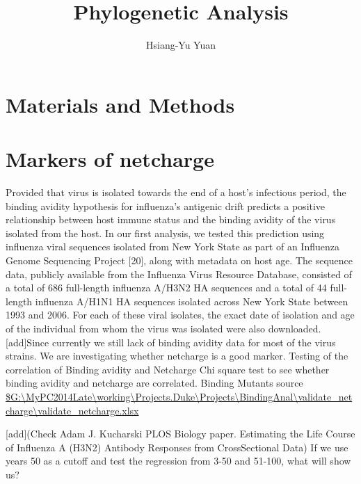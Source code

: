 \documentclass{article}
\begin{document}
\title{Phylogenetic Analysis}
\author{Hsiang-Yu Yuan}
\maketitle


\nocite{*}

\doublespacing
\begin{abstract}
\end{abstract}






\section{Materials and Methods}
                
                
                \section{Markers of netcharge}
                Provided that virus is isolated towards the end of a host’s infectious period, the binding avidity hypothesis for influenza’s antigenic drift predicts a positive relationship between host immune status and the binding avidity of the virus isolated from the host. In our first analysis, we tested this prediction using influenza viral sequences isolated from New York State as part of an Influenza Genome Sequencing Project [20], along with metadata on host age. The sequence data, publicly available from the Influenza Virus Resource Database, consisted of a total of 686 full-length influenza A/H3N2 HA sequences and a total of 44 full-length influenza A/H1N1 HA sequences isolated across New York State between 1993 and 2006. For each of these viral isolates, the exact date of isolation and age of the individual from whom the virus was isolated were also downloaded.\\
                 

[add]Since currently we still lack of binding avidity data for most of the virus strains. We are investigating whether netcharge is a good marker. 
Testing of the correlation of Binding avidity and Netcharge
Chi square test to see whether binding avidity and netcharge are correlated.
Binding Mutants source
\url{$G:\MyPC2014Late\working\Projects.Duke\Projects\BindingAnal\validate_netcharge\validate_netcharge.xlsx}

[add](Check Adam J. Kucharski PLOS Biology paper. Estimating the Life Course of Influenza A (H3N2) Antibody Responses from CrossSectional Data) If we use years 50 as a cutoff and test the regression from 3-50 and 51-100, what will show us? 
                 
\end{document}
